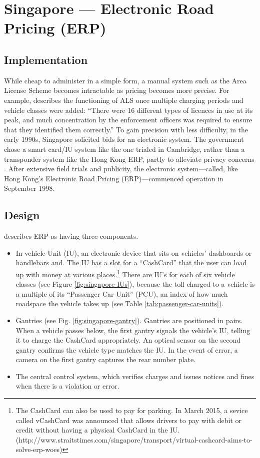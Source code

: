 
\section{Singapore --- Electronic Road Pricing (ERP)}

\subsection{Implementation}

While cheap to administer in a simple form, a manual system such as the Area License Scheme becomes intractable as pricing becomes more precise. For example, \citet[p. 4]{Chin2010} describes the functioning of ALS once multiple charging periods and vehicle classes were added: ``There were 16 different types of licences in use at its peak, and much concentration by the enforcement officers was required to ensure that they identified them correctly.''
To gain precision with less difficulty, in the early 1990s, Singapore solicited bids for an electronic system. The government chose a smart card/IU system like the one trialed in Cambridge, rather than a transponder system like the Hong Kong ERP, partly to alleviate privacy concerns \citep{PhangToh1997,Chin2010}. After extensive field trials and publicity, the electronic system---called, like Hong Kong's Electronic Road Pricing (ERP)---commenced operation in September 1998.

\subsection{Design}

\citet{Menon2004} describes ERP as having three components.

\begin{itemize}
\item In-vehicle Unit (IU), an electronic device that sits on vehicles' dashboards or handlebars and. The IU has a slot for a ``CashCard'' that the user can load up with money at various places.\footnote{The CashCard can also be used to pay for parking. In March 2015, a sevice called vCashCard was announced that allows drivers to pay with debit or credit without having a physical CashCard in the IU. (http://www.straitstimes.com/singapore/transport/virtual-cashcard-aims-to-solve-erp-woes)} There are IU's for each of six vehicle classes (see Figure \ref{fig:singapore-IUs}), because the toll charged to a vehicle is a multiple of its ``Passenger Car Unit'' (PCU), an index of how much roadspace the vehicle takes up (see Table \ref{tab:passenger-car-units}). 

\item Gantries (see Fig. \ref{fig:singapore-gantry}). Gantries are positioned in pairs. When a vehicle passes below, the first gantry signals the vehicle's IU, telling it to charge the CashCard appropriately. An optical sensor on the second gantry confirms the vehicle type matches the IU. In the event of error, a camera on the first gantry captures the rear number plate. 

\item The central control system, which verifies charges and issues notices and fines when there is a violation or error.
\end{itemize}

